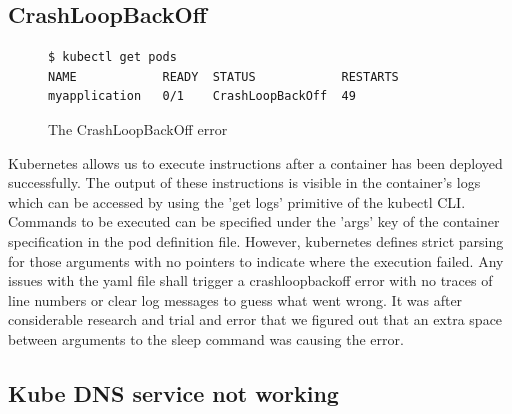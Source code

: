 \documentclass[9pt,twocolumn,twoside]{../../styles/osajnl}
\begin{document}
{\subsection{CrashLoopBackOff}
\begin{figure}[H]
\begin{verbatim}
$ kubectl get pods
NAME            READY  STATUS            RESTARTS  
myapplication   0/1    CrashLoopBackOff  49
\end{verbatim}
\caption{The CrashLoopBackOff error}
\vspace{-3mm}
\label{The CrashLoopBackOff error}
\end{figure}
Kubernetes allows us to execute instructions after a container has
been deployed successfully. The output of these instructions is
visible in the container's logs which can be accessed by using the
'get logs' primitive of the kubectl CLI. Commands to be executed can
be specified under the 'args' key of the container specification in
the pod definition file. However, kubernetes defines strict parsing
for those arguments with no pointers to indicate where the execution
failed. Any issues with the yaml file shall trigger a crashloopbackoff
error with no traces of line numbers or clear log messages to guess
what went wrong. It was after considerable research and trial and
error that we figured out that an extra space between arguments to the
sleep command was causing the error.


\subsection{Kube DNS service not working}

}
\end{document}
